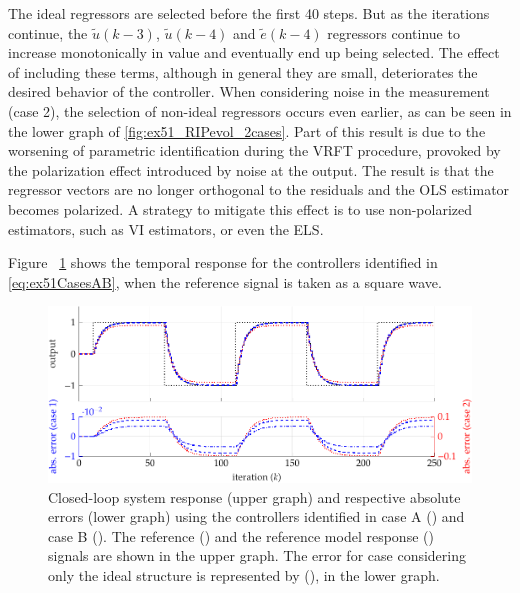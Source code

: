 \begin{exmp}
The ideal regressors are selected before the first 40 steps.
But as the iterations continue, the $\tilde{u}(k-3)$, $\tilde{u}(k-4)$ and $\tilde{e}(k-4)$ regressors continue to increase monotonically in value and eventually end up being selected.
The effect of including these terms, although in general they are small, deteriorates the desired behavior of the controller.
When considering noise in the measurement (case 2), the selection of non-ideal regressors occurs even earlier, as can be seen in the lower graph of \ref{fig:ex51_RIPevol_2cases}.
Part of this result is due to the worsening of parametric identification during the VRFT procedure, provoked by the polarization effect introduced by noise at the output. The result is that the regressor vectors are no longer orthogonal to the residuals and the OLS estimator becomes polarized. A strategy to mitigate this effect is to use non-polarized estimators, such as VI estimators, or even the ELS.

Figure ~\ref{fig:Figs-RespostaSist2aordNARX-png} shows the temporal response for the controllers identified in \eqref{eq:ex51CasesAB}, when the reference signal is taken as a square wave.


\begin{figure}[H]
       
  \centering
  \includegraphics[width=1\textwidth]{./Figs/Cap5/ex51_resp_temporal_mf2.tex.pdf}
  \caption{Closed-loop system response (upper graph) and respective absolute errors (lower graph) using the controllers identified in case A () and case B (). The reference () and the reference model response ()  signals are shown in the upper graph. The error for case considering only the ideal structure is represented by (), in the lower graph.}
  \label{fig:Figs-RespostaSist2aordNARX-png}
\end{figure}


\end{exmp}

